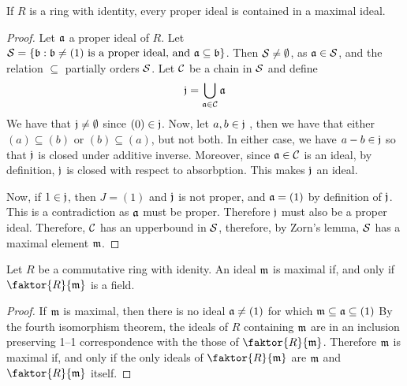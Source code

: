 \begin{lemma}\label{lemma_5.4.3}
  If $R$ is a ring with identity, every proper ideal is contained in a maximal
  ideal.
\end{lemma}
\begin{proof}
  Let $\mathfrak{a}$ a proper ideal of $R$. Let $\mathcal{S}=\{\mathfrak{b} : \mathfrak{b} \neq (1) \text{ is a proper
  ideal, and } \mathfrak{a} \subseteq \mathfrak{b} \}$. Then $\mathcal{S} \neq \emptyset$, as
  $\mathfrak{a} \in \mathcal{S}$, and the relation $\subseteq$ partially orders $\mathcal{S}$. Let
  $\mathcal{C}$ be a chain in $\mathcal{S}$ and define
  \begin{equation*}
    \mathfrak{j}=\bigcup_{\mathfrak{a} \in \mathcal{C}}{\mathfrak{a}}
  \end{equation*}
  We have that $\mathfrak{j} \neq \emptyset$ since  $(0) \in \mathfrak{j}$. Now, let
  $a,b \in \mathfrak{j}$ , then we have that either  $(a) \subseteq (b)$ or
  $(b) \subseteq (a)$, but not both. In either case, we have $a-b \in \mathfrak{j}$
  so that  $\mathfrak{j}$ is closed under additive inverse. Moreover, since
  $\mathfrak{a} \in \mathcal{C}$ is an ideal, by definition, $\mathfrak{j}$ is closed with respect to
  absorbption. This makes  $\mathfrak{j}$ an ideal.

  Now, if  $1 \in \mathfrak{j}$, then $J=(1)$ and $\mathfrak{j}$ is not proper, and $\mathfrak{a}=(1)$ by
  definition of $\mathfrak{j}$. This is a contradiction as $\mathfrak{a}$ must be
  proper. Therefore $\mathfrak{j}$ must also be a proper ideal. Therefore,
  $\mathcal{C}$ has an upperbound in $\mathcal{S}$, therefore, by Zorn's lemma,
  $\mathcal{S}$ has a maximal element $\mathfrak{m}$.
\end{proof}

\begin{lemma}\label{lemma_5.4.4}
  Let $R$ be a commutative ring with idenity. An ideal $\mathfrak{m}$ is maximal if,
  and only if $\faktor{R}{\mf}$ is a field.
\end{lemma}
\begin{proof}
  If $\mathfrak{m}$ is maximal, then there is no ideal $\mathfrak{a} \neq (1)$ for which
  $\mathfrak{m} \subseteq \mathfrak{a} \subseteq (1)$ By the fourth isomorphism theorem,
  the ideals of  $R$ containing $\mathfrak{m}$ are in an inclusion preserving 1--1
  correspondence with the those of $\faktor{R}{\mf}$. Therefore $\mathfrak{m}$ is
  maximal if, and only if the only ideals of $\faktor{R}{\mf}$ are
  $\mathfrak{m}$ and $\faktor{R}{\mf}$ itself.
\end{proof}

